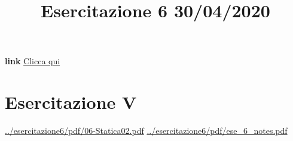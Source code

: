 \title{Esercitazione 6 30/04/2020}\newline
\textbf{link} \href{https://web.microsoftstream.com/video/e7731d3b-34c1-4fd2-a49a-606e7413fb96}{Clicca qui}
\section{Esercitazione V}
\url{../esercitazione6/pdf/06-Statica02.pdf}\newline
\url{../esercitazione6/pdf/ese_6_notes.pdf}
